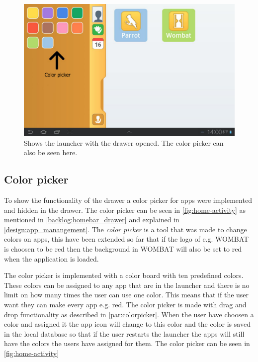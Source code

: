 \begin{figure}[h!]
	\centering
	\includegraphics[scale=0.2]{gfx/home-activity_open}
	\caption{Shows the launcher with the drawer opened. The color picker can also be seen here.}
	\label{fig:home-activity}
\end{figure}

\subsection{Color picker}
\label{home:colorpicker}
To show the functionality of the drawer a color picker for apps were implemented and hidden in the drawer. The color picker can be seen in \autoref{fig:home-activity} as mentioned in \autoref{backlog:homebar_drawer} and explained in \autoref{design:app_manangement}.
The \textit{color picker} is a tool that was made to change colors on apps, this have been extended so far that if the logo of e.g. WOMBAT is choosen to be red then the background in WOMBAT will also be set to red when the application is loaded.

The color picker is implemented with a color board with ten predefined \giraf[] colors. These colors can be assigned to any app that are in the launcher and there is no limit on how many times the user can use one color. This means that if the user want they can make every app e.g. red.
The color picker is made with drag and drop functionality as described in \autoref{par:colorpicker}. When the user have choosen a color and assigned it the app icon will change to this color and the color is saved in the local database so that if the user restarts the launcher the apps will still have the colors the users have assigned for them. 
The color picker can be seen in \autoref{fig:home-activity}

